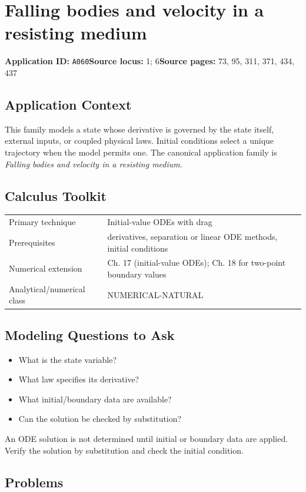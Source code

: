 \documentclass[11pt]{book}
\newcommand{\pid}[1]{\texttt{#1}}
\begin{document}
\chapter{Falling bodies and velocity in a resisting medium}\label{app:A060}
\textbf{Application ID:} \pid{A060}\quad \textbf{Source locus:} 1; 6\quad \textbf{Source pages:} 73, 95, 311, 371, 434, 437
\section*{Application Context}
This family models a state whose derivative is governed by the state itself, external inputs, or coupled physical laws. Initial conditions select a unique trajectory when the model permits one. The canonical application family is \emph{Falling bodies and velocity in a resisting medium}.
\section*{Calculus Toolkit}
\begin{tabularx}{\textwidth}{@{}lX@{}}\toprule
Primary technique & Initial-value ODEs with drag \\
Prerequisites & derivatives, separation or linear ODE methods, initial conditions \\
Numerical extension & Ch. 17 (initial-value ODEs); Ch. 18 for two-point boundary values \\
Analytical/numerical class & NUMERICAL-NATURAL \\
\bottomrule\end{tabularx}
\section*{Modeling Questions to Ask}\begin{itemize}
\item What is the state variable?
\item What law specifies its derivative?
\item What initial/boundary data are available?
\item Can the solution be checked by substitution?
\end{itemize}
\begin{errorbox}An ODE solution is not determined until initial or boundary data are applied. Verify the solution by substitution and check the initial condition.\end{errorbox}
\section*{Problems}
\end{document}
